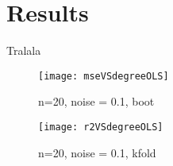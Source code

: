 \section{Results}
\label{sec:results}
Tralala

\begin{figure}[htbp]
	\centering
	\texttt{[image: mseVSdegreeOLS]}
	\caption{n=20, noise = 0.1, boot}
	\label{fig:mseVSdegreeOLS}
\end{figure}

\begin{figure}[htbp]
	\centering
	\texttt{[image: r2VSdegreeOLS]}
	\caption{n=20, noise = 0.1, kfold}
	\label{fig:r2VSdegreeOLS}
\end{figure}



